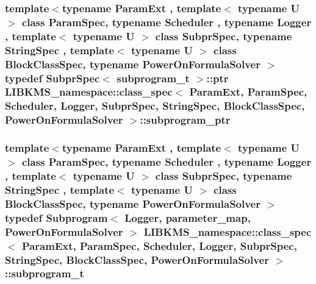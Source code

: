 \hypertarget{structLIBKMS__namespace_1_1class__spec_a4b3f90a3ca3d3b067ea8514815908320}{
\subsubsection[{subprogram\-\_\-ptr}]{\setlength{\rightskip}{0pt plus 5cm}template$<$typename Param\-Ext , template$<$ typename U $>$ class Param\-Spec, typename Scheduler , typename Logger , template$<$ typename U $>$ class Subpr\-Spec, typename String\-Spec , template$<$ typename U $>$ class Block\-Class\-Spec, typename Power\-On\-Formula\-Solver $>$ typedef Subpr\-Spec$<$ {\bf subprogram\-\_\-t} $>$\-::ptr {\bf L\-I\-B\-K\-M\-S\-\_\-namespace\-::class\-\_\-spec}$<$ Param\-Ext, Param\-Spec, Scheduler, Logger, Subpr\-Spec, String\-Spec, Block\-Class\-Spec, Power\-On\-Formula\-Solver $>$\-::{\bf subprogram\-\_\-ptr}}}\label{structLIBKMS__namespace_1_1class__spec_a4b3f90a3ca3d3b067ea8514815908320}
\hypertarget{structLIBKMS__namespace_1_1class__spec_a145748a703c1c753bce703ced41fc506}{
\subsubsection[{subprogram\-\_\-t}]{\setlength{\rightskip}{0pt plus 5cm}template$<$typename Param\-Ext , template$<$ typename U $>$ class Param\-Spec, typename Scheduler , typename Logger , template$<$ typename U $>$ class Subpr\-Spec, typename String\-Spec , template$<$ typename U $>$ class Block\-Class\-Spec, typename Power\-On\-Formula\-Solver $>$ typedef {\bf Subprogram}$<$ Logger, {\bf parameter\-\_\-map}, Power\-On\-Formula\-Solver $>$ {\bf L\-I\-B\-K\-M\-S\-\_\-namespace\-::class\-\_\-spec}$<$ Param\-Ext, Param\-Spec, Scheduler, Logger, Subpr\-Spec, String\-Spec, Block\-Class\-Spec, Power\-On\-Formula\-Solver $>$\-::{\bf subprogram\-\_\-t}}}\label{structLIBKMS__namespace_1_1class__spec_a145748a703c1c753bce703ced41fc506}

